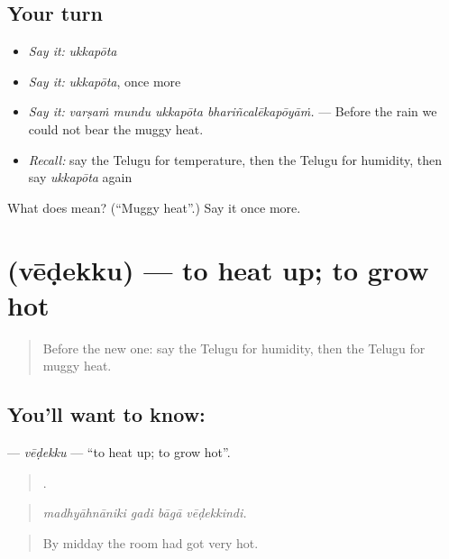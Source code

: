 \subsection*{Your turn}
\begin{itemize}
\raggedright
  \item \emph{Say it:} \emph{ukkapōta}
  \item \emph{Say it:} \emph{ukkapōta}, once more
  \item \emph{Say it:} \emph{varṣaṁ mundu ukkapōta bhariñcalēkapōyāṁ.} — Before the rain we could not bear the muggy heat.
  \item \emph{Recall:} say the Telugu for temperature, then the Telugu for humidity, then say \emph{ukkapōta} again
\end{itemize}

\begin{tcolorbox}[breakable,colback=teal!4,colframe=teal!35!black,title={Before you move on}]
What does  mean? (\textquotedblleft{}Muggy heat\textquotedblright{}.) Say it once more.
\end{tcolorbox}
\section[\texorpdfstring{\te{వేడెక్కు} (vēḍekku)}{వేడెక్కు (vēḍekku)}]{ (vēḍekku) — to heat up; to grow hot}

\label{lesson:TE-C476-vedekku}



\begin{quote}
Before the new one: say the Telugu for humidity, then the Telugu for muggy heat.
\end{quote}

\subsection*{You'll want to know: }
\textbf{} — \emph{vēḍekku} — \textquotedblleft{}to heat up; to grow hot\textquotedblright{}.

\begin{quote}
   .
\end{quote}

\begin{quote}
\emph{madhyāhnāniki gadi bāgā vēḍekkindi.}
\end{quote}

\begin{quote}
By midday the room had got very hot.
\end{quote}

